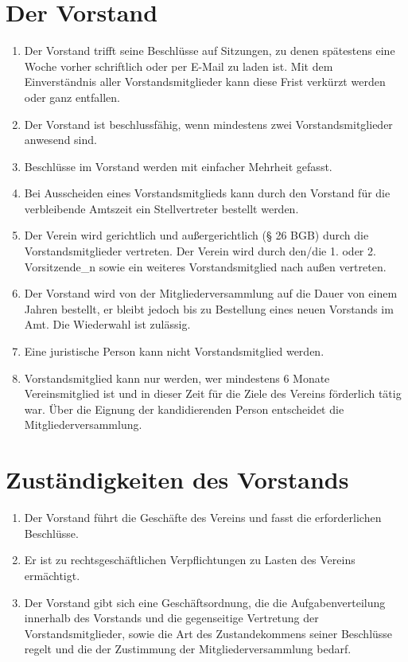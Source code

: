 \documentclass[a4paper, 12pt]{scrartcl}
\begin{document}
\section{Der Vorstand}
\label{der-vorstand}
\begin{enumerate}
\item Der Vorstand trifft seine Beschlüsse auf Sitzungen, zu denen spätestens eine Woche vorher schriftlich oder per E-Mail zu laden ist. Mit dem Einverständnis aller Vorstandsmitglieder kann diese Frist verkürzt werden oder ganz entfallen.
	\item Der Vorstand ist beschlussfähig, wenn mindestens zwei Vorstandsmitglieder anwesend sind.
	\item Beschlüsse im Vorstand werden mit einfacher Mehrheit gefasst.
	\item Bei Ausscheiden eines Vorstandsmitglieds kann durch den Vorstand für die verbleibende Amtszeit ein Stellvertreter bestellt werden.
	\item \label{der-vorstand-vertretung} Der Verein wird gerichtlich und außergerichtlich (§ 26 BGB) durch die Vorstandsmitglieder vertreten. Der Verein wird durch den/die 1. oder 2. Vorsitzende\_n sowie ein weiteres Vorstandsmitglied nach außen vertreten.
	\item Der Vorstand wird von der Mitgliederversammlung auf die Dauer von einem Jahren bestellt, er bleibt jedoch bis zu Bestellung eines neuen Vorstands im Amt. Die Wiederwahl ist zulässig.
	\item Eine juristische Person kann nicht Vorstandsmitglied werden.
	\item \label{der-vorstand-zugehoerigkeit}Vorstandsmitglied kann nur werden, wer mindestens 6 Monate Vereinsmitglied ist und in dieser Zeit für die Ziele des Vereins förderlich
tätig war. Über die Eignung der kandidierenden Person entscheidet die Mitgliederversammlung.
\end{enumerate}

\section{Zuständigkeiten des Vorstands}
\begin{enumerate}
	\item Der Vorstand führt die Geschäfte des Vereins und fasst die erforderlichen Beschlüsse.
	\item Er ist zu rechtsgeschäftlichen Verpflichtungen zu Lasten des Vereins ermächtigt.
	\item Der Vorstand gibt sich eine Geschäftsordnung, die die Aufgabenverteilung innerhalb des Vorstands und die gegenseitige Vertretung der Vorstandsmitglieder, sowie die Art des Zustandekommens seiner Beschlüsse regelt und die der Zustimmung der Mitgliederversammlung bedarf.
\end{enumerate}
\end{document}
